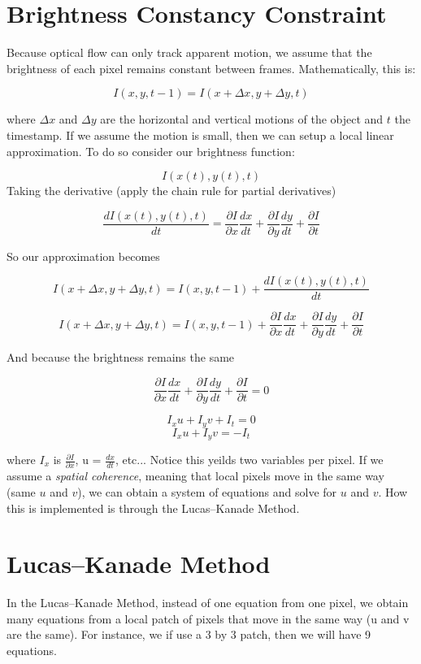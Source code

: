 \documentclass{article}
\begin{document}
\section{Brightness Constancy Constraint}
Because optical flow can only track apparent motion, we assume that the brightness of each pixel remains constant between frames. Mathematically, this is:

$$ I(x, y, t-1) = I(x+\Delta x, y+\Delta y, t)$$

\noindent
where $\Delta x$ and $\Delta y$ are the horizontal and vertical motions of the object and $t$ the timestamp. If we assume the motion is small, then we can setup a local linear approximation. To do so consider our brightness function:

$$ I(x(t), y(t), t)$$
\noindent
Taking the derivative (apply the chain rule for partial derivatives)

$$ \frac{dI(x(t), y(t), t)}{dt} = \frac{\partial I}{\partial x}\frac{dx}{dt} + \frac{\partial I}{\partial y}\frac{dy}{dt} + \frac{\partial I}{\partial t}$$

\noindent
So our approximation becomes

$$I(x+\Delta x, y+\Delta y, t) = I(x, y, t-1) + \frac{dI(x(t), y(t), t)}{dt} $$

$$I(x+\Delta x, y+\Delta y, t) = I(x, y, t-1) + \frac{\partial I}{\partial x}\frac{dx}{dt} + \frac{\partial I}{\partial y}\frac{dy}{dt} + \frac{\partial I}{\partial t}$$

\noindent
And because the brightness remains the same

$$ \frac{\partial I}{\partial x}\frac{dx}{dt} + \frac{\partial I}{\partial y}\frac{dy}{dt} + \frac{\partial I}{\partial t} = 0$$

$$ I_xu + I_yv + I_t  = 0$$
$$ I_xu + I_yv = -I_t$$

\noindent
where  $I_x$ is $\frac{\partial I}{\partial x}$, u = $\frac{dx}{dt}$, etc... Notice this yeilds two variables per pixel. If we assume a \textit{spatial coherence}, meaning that local pixels move in the same way (same $u$ and $v$), we can obtain a system of equations and solve for $u$ and $v$. How this is implemented is through the Lucas–Kanade Method.

\section{Lucas–Kanade Method}
In the Lucas–Kanade Method, instead of one equation from one pixel, we obtain many equations from a local patch of pixels that move in the same way (u and v are the same). For instance, we if use a 3 by 3 patch, then we will have 9 equations.
\end{document}
